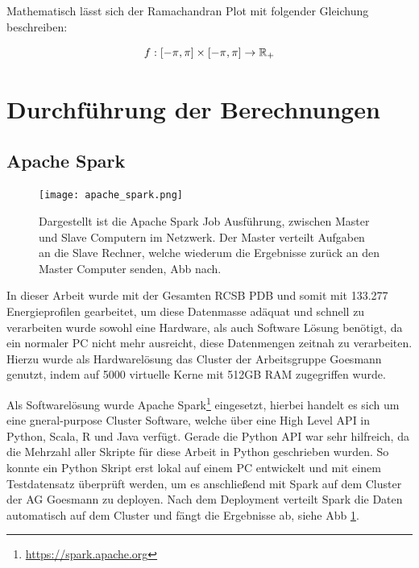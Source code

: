 Mathematisch lässt sich der Ramachandran Plot mit folgender Gleichung beschreiben:

\begin{equation}
    f : [-\pi,\pi]\times[-\pi,\pi] \rightarrow \mathbb{R}_{+}
    \label{eq:rama_eq}
\end{equation}


\newpage
\section{Durchführung der Berechnungen}


\subsection{Apache Spark}

\begin{figure}
\texttt{[image: apache\_spark.png]}
\caption{Dargestellt ist die Apache Spark Job Ausführung, zwischen Master und Slave Computern im Netzwerk. Der Master verteilt Aufgaben an die Slave Rechner, welche wiederum die Ergebnisse zurück an den Master Computer senden, \ac{Abb} nach\protect\footnotemark.}
\label{fig:apache_spark}
\end{figure}

In dieser Arbeit wurde mit der Gesamten RCSB \ac{PDB} und somit mit 133.277 Energieprofilen gearbeitet, um diese Datenmasse adäquat und schnell zu verarbeiten wurde sowohl eine Hardware, als auch Software Lösung benötigt, da ein normaler PC nicht mehr ausreicht, diese Datenmengen zeitnah zu verarbeiten. Hierzu wurde als Hardwarelösung das Cluster der Arbeitsgruppe Goesmann genutzt, indem auf 5000 virtuelle Kerne mit 512GB RAM zugegriffen wurde. 

Als Softwarelösung wurde Apache Spark\footnote{\url{https://spark.apache.org}} eingesetzt, hierbei handelt es sich um eine gneral-purpose Cluster Software, welche über eine High Level API in Python, Scala, R und Java verfügt. Gerade die Python API war sehr hilfreich, da die Mehrzahl aller Skripte für diese Arbeit in Python geschrieben wurden. So konnte ein Python Skript erst lokal auf einem PC entwickelt und mit einem Testdatensatz überprüft werden, um es anschließend mit Spark auf dem Cluster der AG Goesmann zu deployen. Nach dem Deployment verteilt Spark die Daten automatisch auf dem Cluster und fängt die Ergebnisse ab, siehe \ac{Abb} \ref{fig:apache_spark}. 

